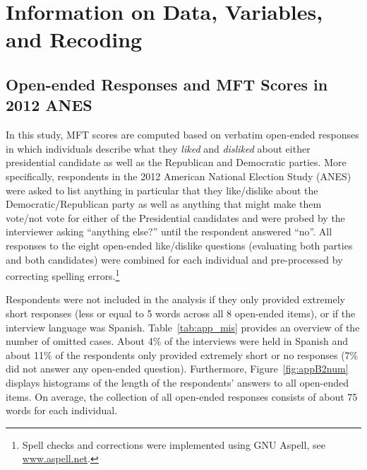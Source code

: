 \documentclass[12pt]{article}
\begin{document}
\clearpage

\renewcommand\thefigure{\thesection.\arabic{figure}}
\renewcommand\thetable{\thesection.\arabic{table}}
\setcounter{figure}{0}
\setcounter{table}{0}

\section{Information on Data, Variables, and Recoding}

\subsection{Open-ended Responses and MFT Scores in 2012 ANES}

In this study, MFT scores are computed based on verbatim open-ended responses in which individuals describe what they \textit{liked} and \textit{disliked} about either presidential candidate as well as the Republican and Democratic parties. More specifically, respondents in the 2012 American National Election Study (ANES) were asked to list anything in particular that they like/dislike about the Democratic/Republican party as well as anything that might make them vote/not vote for either of the Presidential candidates and were probed by the interviewer asking ``anything else?'' until the respondent answered ``no''. All responses to the eight open-ended like/dislike questions (evaluating both parties and both candidates) were combined for each individual and pre-processed by correcting spelling errors.\footnote{Spell checks and corrections were implemented using GNU Aspell, see \url{www.aspell.net}.}



Respondents were not included in the analysis if they only provided extremely short responses (less or equal to 5 words across all 8 open-ended items), or if the interview language was Spanish. Table~\ref{tab:app_mis} provides an overview of the number of omitted cases. About 4\% of the interviews were held in Spanish and about 11\% of the respondents only provided extremely short or no responses (7\% did not answer any open-ended question). Furthermore, Figure~\ref{fig:appB2num} displays histograms of the length of the respondents' answers to all open-ended items. On average, the collection of all open-ended responses consists of about 75 words for each individual.
\end{document}
